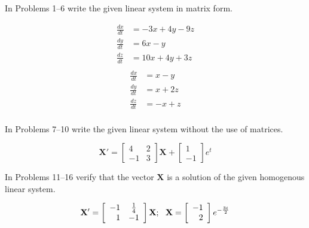 \documentclass[chapter=8,section=1]{math252homework}
\begin{document}
In Problems 1--6 write the given linear system in matrix form.
\begin{problems}[start=3]
	\problem \begin{equation*}
	\begin{aligned}
		\frac{dx}{dt} &= -3x + 4y - 9z\\
		\frac{dy}{dt} &= 6x - y\\
		\frac{dz}{dt} &= 10x + 4y + 3z\\
	\end{aligned}
	\end{equation*}			%
	\problem \begin{equation*}
	\begin{aligned}
		\frac{dx}{dt} &= x - y\\
		\frac{dy}{dt} &= x + 2z\\
		\frac{dz}{dt} &= -x + z\\
	\end{aligned}
	\end{equation*}			%
\end{problems}

In Problems 7--10 write the given linear system without the use of matrices.
\begin{problems}[start=7]
	\problem \[ \mathbf{X}' = \left[ \begin{array}{rc}
		4 & 2\\
		-1 & 3
	\end{array} \right]\mathbf{X} + \left[ \begin{array}{r}
		1\\
		-1
	\end{array} \right] e^{t} \]			%
\end{problems}

In Problems 11--16 verify that the vector $\mathbf{X}$ is a solution of the given homogenous linear system.
\begin{problems}[start=13]
	\problem \[ \mathbf{X'} = \left[ \begin{array}{rc}
		-1 & \frac{1}{4}\\
		1 & -1\\
	\end{array} \right]\mathbf{X};\mbox{{ }{ }} \mathbf{X} = \left[ \begin{array}{r}
		-1\\
		2
	\end{array} \right]e^{-\frac{3t}{2}} \]			%
\end{problems}
\end{document}
